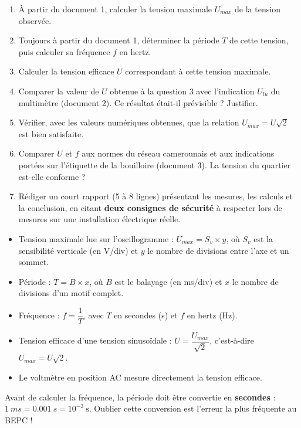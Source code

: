 \documentclass[11pt]{article}
\newcommand{\cle}[1]{{\popxbold\color{popdark}#1}}
\newcounter{popsec}
\newcounter{popsub}
\newcommand{\courssub}[1]{%
  \stepcounter{popsub}%
  \par\vspace{9pt}\noindent{\popxbold\fontsize{11.5}{13}\selectfont\color{popink}{\color{poporange}\thepopsec.\thepopsub}\hspace{6pt}#1}\par\nopagebreak\vspace{4pt}
}
\begin{document}
\begin{enumerate}
\item À partir du document 1, calculer la tension maximale $U_{max}$ de la tension observée.
\item Toujours à partir du document 1, déterminer la période $T$ de cette tension, puis calculer sa fréquence $f$ en hertz.
\item Calculer la tension efficace $U$ correspondant à cette tension maximale.
\item Comparer la valeur de $U$ obtenue à la question 3 avec l'indication $U_{lu}$ du multimètre (document 2). Ce résultat était-il prévisible ? Justifier.
\item Vérifier, avec les valeurs numériques obtenues, que la relation $U_{max} = U\sqrt{2}$ est bien satisfaite.
\item Comparer $U$ et $f$ aux normes du réseau camerounais et aux indications portées sur l'étiquette de la bouilloire (document 3). La tension du quartier est-elle conforme ?
\item Rédiger un court rapport (5 à 8 lignes) présentant les mesures, les calculs et la conclusion, en citant \textbf{deux consignes de sécurité} à respecter lors de mesures sur une installation électrique réelle.
\end{enumerate}

\courssub{Ressources à mobiliser}

\begin{aretenir}
\begin{itemize}
\item Tension maximale lue sur l'oscillogramme : $U_{max} = S_v \times y$, où $S_v$ est la sensibilité verticale (en V/div) et $y$ le nombre de divisions entre l'axe et un sommet.
\item Période : $T = B \times x$, où $B$ est le balayage (en ms/div) et $x$ le nombre de divisions d'un motif complet.
\item Fréquence : $f = \dfrac{1}{T}$, avec $T$ en secondes (s) et $f$ en hertz (Hz).
\item Tension efficace d'une tension sinusoïdale : $U = \dfrac{U_{max}}{\sqrt{2}}$, c'est-à-dire $U_{max} = U\sqrt{2}$.
\item Le voltmètre en position AC mesure directement la tension \cle{efficace}.
\end{itemize}
\end{aretenir}

\begin{attention}
Avant de calculer la fréquence, la période doit être convertie en \textbf{secondes} : $\SI{1}{ms} = \SI{0,001}{s} = 10^{-3}\ \text{s}$. Oublier cette conversion est l'erreur la plus fréquente au BEPC !
\end{attention}
\end{document}
